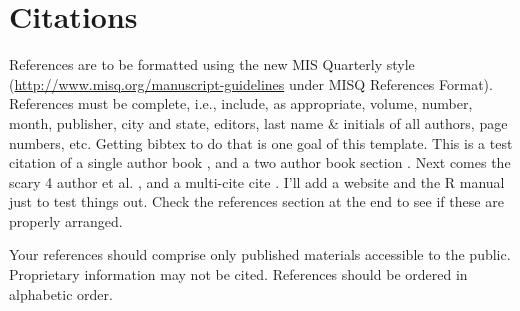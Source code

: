 \documentclass{icis}
\begin{document}
\section{Citations}

References are to be formatted using the new MIS Quarterly style (\url{http://www.misq.org/manuscript-guidelines} under MISQ References Format). References must be complete, i.e., include, as appropriate, volume, number, month, publisher, city and state, editors, last name \& initials of all authors, page numbers, etc. Getting bibtex to do that is one goal of this
template. This is a test citation of a single author book
\autocite{bonini_simulation_1963}, and a two author book section
\autocite{chenhall_formal_1989}. Next comes the scary 4 author et
al. \autocite{zhang2006}, and a multi-cite cite \autocite{bonini_simulation_1963,
  ackoff_management_1961}.  I'll add a website \autocite{Ahlers2013} and the R manual
\autocite{R2014} just to test things out. Check the references section at the end to see if these are properly arranged.

Your references should comprise only published materials accessible to the public. Proprietary information may not be cited.
References should be ordered in alphabetic order.

% 
% 

\printbibliography
\end{document}
